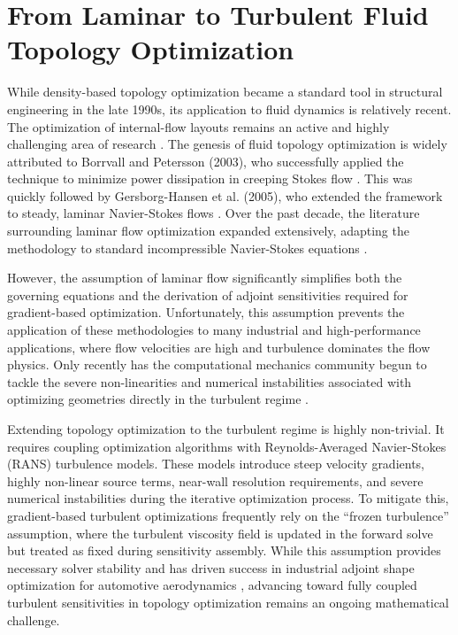 \section{From Laminar to Turbulent Fluid Topology Optimization}
While density-based topology optimization became a standard tool in structural engineering in the late 1990s, its application to fluid dynamics is relatively recent. The optimization of internal-flow layouts remains an active and highly challenging area of research \cite{Fawaz2022}. The genesis of fluid topology optimization is widely attributed to Borrvall and Petersson (2003), who successfully applied the technique to minimize power dissipation in creeping Stokes flow \cite{Borrvall2003}. This was quickly followed by Gersborg-Hansen et al. (2005), who extended the framework to steady, laminar Navier-Stokes flows \cite{Gersborg2005}. Over the past decade, the literature surrounding laminar flow optimization expanded extensively, adapting the methodology to standard incompressible Navier-Stokes equations \cite{Deng2013, Alexandersen2020, Zhou2017}.

However, the assumption of laminar flow significantly simplifies both the governing equations and the derivation of adjoint sensitivities required for gradient-based optimization. Unfortunately, this assumption prevents the application of these methodologies to many industrial and high-performance applications, where flow velocities are high and turbulence dominates the flow physics. Only recently has the computational mechanics community begun to tackle the severe non-linearities and numerical instabilities associated with optimizing geometries directly in the turbulent regime \cite{Yoon2016, Dilgen2018, Zhao2021}.

Extending topology optimization to the turbulent regime is highly non-trivial. It requires coupling optimization algorithms with Reynolds-Averaged Navier-Stokes (RANS) turbulence models. These models introduce steep velocity gradients, highly non-linear source terms, near-wall resolution requirements, and severe numerical instabilities during the iterative optimization process. To mitigate this, gradient-based turbulent optimizations frequently rely on the ``frozen turbulence'' assumption, where the turbulent viscosity field is updated in the forward solve but treated as fixed during sensitivity assembly. While this assumption provides necessary solver stability and has driven success in industrial adjoint shape optimization for automotive aerodynamics \cite{Othmer2014}, advancing toward fully coupled turbulent sensitivities in topology optimization remains an ongoing mathematical challenge.

